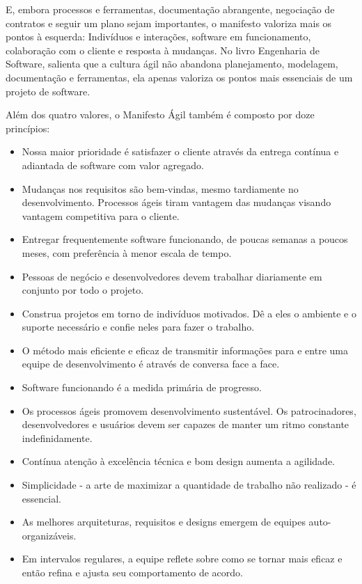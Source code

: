 \documentclass[
    12pt,       %
    openright,      %
    twoside,      %
    a4paper,      %
    english,      %
    french,       %
    spanish,      %
    brazil,       %
    ]{abntex2}
\begin{document}
E, embora processos e ferramentas, documentação abrangente, negociação de contratos e seguir um plano sejam importantes, o manifesto valoriza mais os pontos à esquerda: Indivíduos e interações, software em funcionamento, colaboração com o cliente e resposta à mudanças. No livro Engenharia de Software,  salienta que a cultura ágil não abandona planejamento, modelagem, documentação e ferramentas, ela apenas valoriza os pontos mais essenciais de um projeto de software.

Além dos quatro valores, o Manifesto Ágil \cite{AGILEMANIFEST:2001} também é composto por doze princípios: 

\begin{itemize}
        \item Nossa maior prioridade é satisfazer o cliente através da entrega contínua e adiantada de software com valor agregado.
        \item Mudanças nos requisitos são bem-vindas, mesmo tardiamente no desenvolvimento. Processos ágeis tiram vantagem das mudanças visando vantagem competitiva para o cliente.
        \item Entregar frequentemente software funcionando, de poucas semanas a poucos meses, com preferência à menor escala de tempo.
        \item Pessoas de negócio e desenvolvedores devem trabalhar diariamente em conjunto por todo o projeto.
        \item Construa projetos em torno de indivíduos motivados. Dê a eles o ambiente e o suporte necessário e confie neles para fazer o trabalho.
        \item O método mais eficiente e eficaz de transmitir informações para e entre uma equipe de desenvolvimento é através de conversa face a face.
        \item Software funcionando é a medida primária de progresso.
        \item Os processos ágeis promovem desenvolvimento sustentável. Os patrocinadores, desenvolvedores e usuários devem ser capazes de manter um ritmo constante indefinidamente.
        \item Contínua atenção à excelência técnica e bom design aumenta a agilidade.
        \item Simplicidade - a arte de maximizar a quantidade de trabalho não realizado - é essencial.
        \item As melhores arquiteturas, requisitos e designs emergem de equipes auto-organizáveis.
        \item Em intervalos regulares, a equipe reflete sobre como se tornar mais eficaz e então refina e ajusta seu comportamento de acordo.
\end{itemize}
\end{document}
